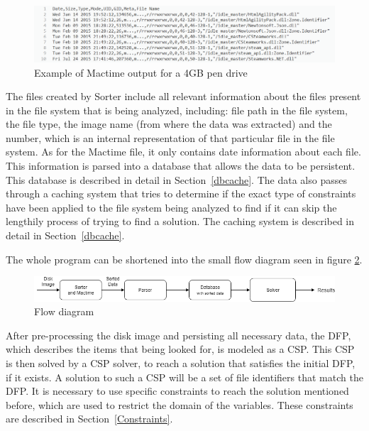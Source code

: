 \begin{figure}[ht]
    \centering
    \includegraphics[width=120mm]{mactimeOut.png}
    \caption{Example of Mactime output for a 4GB pen drive}
    \label{fig:mactimeOut}
\end{figure}

The files created by Sorter include all relevant information about the files present in the file system that is being analyzed, including: file path in the file system, the file type, the image name (from where the data was extracted) and the \INODE number, which is an internal representation of that particular file in the file system. As for the Mactime file, it only contains date information about each file. This information is parsed into a database that allows the data to be persistent. This database is described in detail in Section~\ref{dbcache}. The data also passes through a caching system that tries to determine if the exact type of constraints have been applied to the file system being analyzed to find if it can skip the lengthily process of trying to find a solution. The caching system is described in detail in Section~\ref{dbcache}.

The whole program can be shortened into the small flow diagram seen in figure \ref{fig:diagram}.

\begin{figure}[h]
    \centering
    \includegraphics[width=120mm]{diagram.png}
    \caption{Flow diagram}
    \label{fig:diagram}
\end{figure}

After pre-processing the disk image and persisting all necessary data, the \ac{DFP}, which describes the items that being looked for, is modeled as a \ac{CSP}. This \ac{CSP} is then solved by a \ac{CSP} solver, to reach a solution that satisfies the initial \ac{DFP}, if it exists. A solution to such a \ac{CSP} will be a set of file identifiers that match the \ac{DFP}. It is necessary to use specific constraints to reach the solution mentioned before, which are used to restrict the domain of the variables. These constraints are described in Section~\ref{Constraints}.

